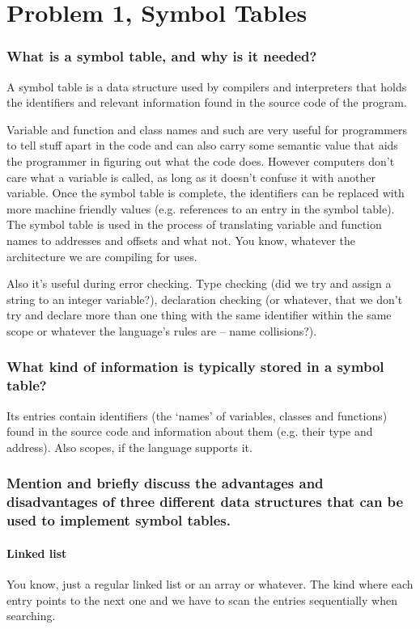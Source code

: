 
\section{Problem 1, Symbol Tables}
\subsubsection{What is a symbol table, and why is it needed?}
A symbol table is a data structure used by compilers and interpreters that holds the identifiers and relevant information found in the source code of the program.

Variable and function and class names and such are very useful for programmers to tell stuff apart in the code and can also carry some semantic value that aids the programmer in figuring out what the code does.
However computers don't care what a variable is called, as long as it doesn't confuse it with another variable.
Once the symbol table is complete, the identifiers can be replaced with more machine friendly values (e.g. references to an entry in the symbol table).
The symbol table is used in the process of translating variable and function names to addresses and offsets and what not.
You know, whatever the architecture we are compiling for uses.

Also it's useful during error checking.
Type checking (did we try and assign a string to an integer variable?), declaration checking (or whatever, that we don't try and declare more than one thing with the same identifier within the same scope or whatever the language's rules are -- name collisions?).


\subsubsection{What kind of information is typically stored in a symbol table?}
Its entries contain identifiers (the `names' of variables, classes and functions) found in the source code and information about them (e.g. their type and address).
Also scopes, if the language supports it.

\subsubsection{Mention and briefly discuss the advantages and disadvantages of three different data structures that can be used to implement symbol tables.}
\paragraph{Linked list}
You know, just a regular linked list or an array or whatever.
The kind where each entry points to the next one and we have to scan the entries sequentially when searching.

